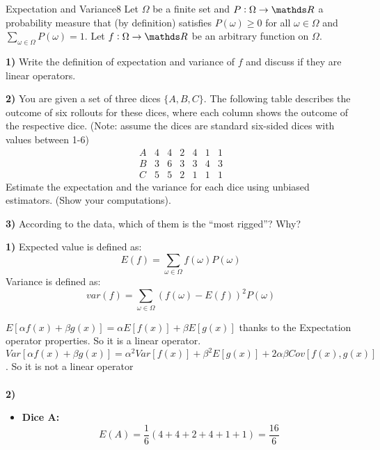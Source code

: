 \newif\ifvimbug
\vimbugfalse

\ifvimbug

\fi

 

\begin{questions}


\begin{question}{Expectation and Variance}{8}
Let $\Omega$ be a finite set and $P:\Omega\rightarrow\R$ a probability measure that (by definition) satisfies $P(\omega)\geq0$ for all $\omega\in\Omega$ and $\sum_{\omega\in\Omega}P(\omega)=1$. 
Let $f:\Omega\rightarrow\R$ be an arbitrary function on $\Omega$.

\textbf{1)} Write the definition of expectation and variance of $f$ and discuss if they are linear operators.

\textbf{2)} You are given a set of three dices $\{A,B,C\}$.
The following table describes the outcome of six rollouts for these dices, where each column shows the outcome of the respective dice. 
(Note: assume the dices are standard six-sided dices with values between 1-6)
\begin{equation*}
\begin{array}{r|cccccc}
    A & 4 & 4 & 2 & 4 & 1 & 1 \\
    \hline
    B & 3 & 6 & 3 & 3 & 4 & 3 \\
    \hline
    C & 5 & 5 & 2 & 1 & 1 & 1 
\end{array}
\end{equation*}
Estimate the expectation and the variance for each dice using unbiased estimators. (Show your computations).

\textbf{3)} According to the data, which of them is the ``most rigged''? Why?

\begin{answer}
\textbf{1)} Expected value is defined as:
$$E(f) = \sum_{\omega \in \Omega} f(\omega)P(\omega)$$
Variance is defined as:
$$var(f) = \sum_{\omega \in \Omega} (f(\omega)-E(f))^2P(\omega)$$

$ E[\alpha f(x) + \beta g(x)] = \alpha  E[f(x)] + \beta E[g(x)]$ thanks to the Expectation operator properties. So it is a linear operator. \\
$ Var[\alpha f(x) + \beta g(x)] = \alpha^{2}  Var[f(x)] + \beta^{2} E[g(x)] + 2\alpha \beta Cov[f(x),g(x)] $. So it is not a linear operator \\ \\
\textbf{2)} \begin{itemize}
	\item \textbf{Dice A: } \newline
	$$
	E(A) = \frac{1}{6} (4+4+2+4+1+1 ) = \frac{16}{6}
	$$
	

\end{itemize}
\end{answer}
\end{question}
\end{questions}
